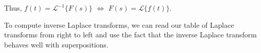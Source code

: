 \documentclass[12pt]{amsart}
\numberwithin{equation}{section}
\theoremstyle{plain} %
\newcommand{\rsa}{\rightsquigarrow}
\theoremstyle{definition}
\newtheorem{ex}[equation]{Example}
\newtheorem{fact}[equation]{Fact}
\theoremstyle{remark}
\newcommand{\LA}[1]{\mathcal{L}\{ #1 \}}
\newcommand{\LAi}[1]{\mathcal{L}^{-1}\{ #1 \}}
\begin{document}
Thus, $f(t) = \LAi{F(s)}$ $\Leftrightarrow$ $F(s) = \LA{f(t)}$.

To compute inverse Laplace transforms, we can read our table of Laplace transforms from right to left and use the fact that the inverse Laplace transform behaves well with superpositions.

\end{document}
